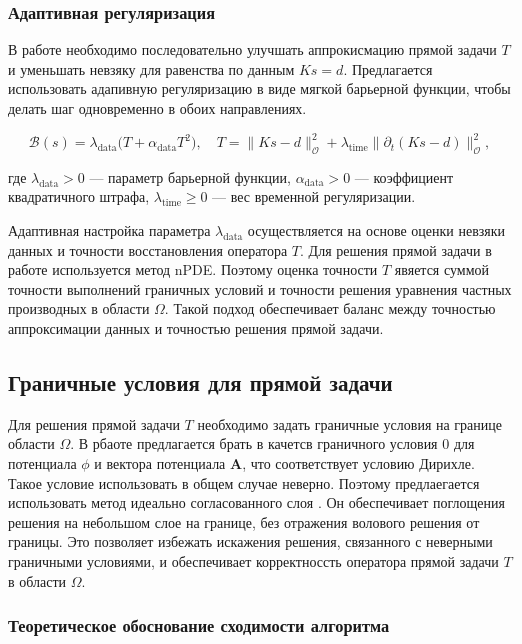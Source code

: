 \documentclass[a4paper,14pt,oneside,openany]{extarticle}
\begin{document}
\subsubsection{Адаптивная регуляризация}

В работе необходимо последовательно улучшать аппрокисмацию прямой задачи $T$ и уменьшать невзяку для равенства по данным $Ks = d$.
Предлагается использовать адапивную регуляризацию в виде мягкой барьерной функции, чтобы делать шаг одновременно в обоих направлениях.

\begin{equation}
    \mathcal{B}(s) = \lambda_{\mathrm{data}} \bigl(T + \alpha_{\mathrm{data}} T^2\bigr),
    \quad T = \|Ks - d\|_{\mathcal{O}}^2 + \lambda_{\mathrm{time}} \|\partial_t (Ks - d)\|_{\mathcal{O}}^2,
\end{equation}

где $\lambda_{\mathrm{data}} > 0$ --- параметр барьерной функции, $\alpha_{\mathrm{data}} > 0$ --- коэффициент квадратичного штрафа, $\lambda_{\mathrm{time}} \geq 0$ --- вес временной регуляризации.

Адаптивная настройка параметра $\lambda_{\mathrm{data}}$ осуществляется на основе оценки невзяки данных и точности восстановления оператора $T$.
Для решения прямой задачи в работе используется метод nPDE. Поэтому оценка точности $T$ явяется суммой точности выполнений граничных условий и
точности решения уравнения частных производных в области $\Omega$.
Такой подход обеспечивает баланс между точностью аппроксимации данных и точностью решения прямой задачи.

\subsection{Граничные условия для прямой задачи}
Для решения прямой задачи $T$ необходимо задать граничные условия на границе области $\Omega$.
В рбаоте предлагается брать в качетсв граничного условия $0$ для потенциала $\phi$ и вектора потенциала $\mathbf{A}$, что соответствует условию Дирихле.
Такое условие использовать в общем случае неверно. Поэтому предлаегается использовать метод идеально согласованного слоя \cite{Becache2004}. Он обеспечивает
поглощения решения на небольшом слое на границе, без отражения волового решения от границы. Это позволяет избежать искажения решения, связанного с неверными 
граничными условиями, и обеспечивает корректноссть оператора прямой задачи $T$ в области $\Omega$.
\subsubsection{Теоретическое обоснование сходимости алгоритма}
\end{document}
